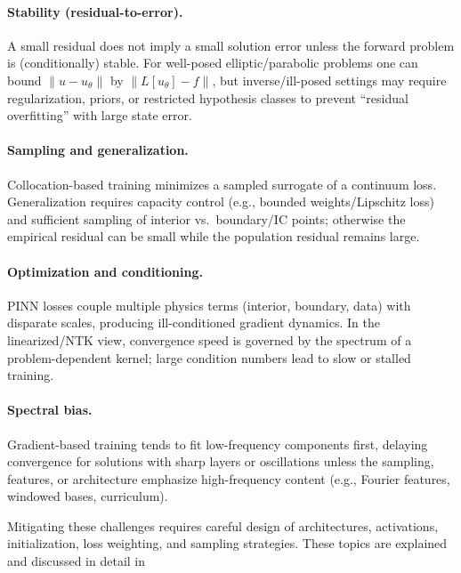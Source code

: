 \documentclass[superscriptaddress,unsortedaddress,amsmath,amssymb,aps]{revtex4-2}
\begin{document}
\paragraph{Stability (residual-to-error).}
A small residual does not imply a small solution error unless the forward problem is (conditionally) stable. 
For well-posed elliptic/parabolic problems one can bound $\|u-u_\theta\|$ by $\|L[u_\theta]-f\|$, but inverse/ill-posed settings may require regularization, priors, or restricted hypothesis classes to prevent ``residual overfitting'' with large state error.

\paragraph{Sampling and generalization.}
Collocation-based training minimizes a sampled surrogate of a continuum loss. 
Generalization requires capacity control (e.g., bounded weights/Lipschitz loss) and sufficient sampling of interior vs.\ boundary/IC points; otherwise the empirical residual can be small while the population residual remains large. 

\paragraph{Optimization and conditioning.}
PINN losses couple multiple physics terms (interior, boundary, data) with disparate scales, producing ill-conditioned gradient dynamics. 
In the linearized/NTK view, convergence speed is governed by the spectrum of a problem-dependent kernel; large condition numbers lead to slow or stalled training. 

\paragraph{Spectral bias.}
Gradient-based training tends to fit low-frequency components first, delaying convergence for solutions with sharp layers or oscillations unless the sampling, features, or architecture emphasize high-frequency content (e.g., Fourier features, windowed bases, curriculum).

\medskip
Mitigating these challenges requires careful design of architectures, activations, initialization, loss weighting, and sampling strategies. These topics are explained and discussed in detail in \cite{De_Ryck_2024}
\end{document}
